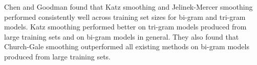 %
%
%
%
%
%

Chen and Goodman found that Katz smoothing and Jelinek-Mercer smoothing performed consistently well across training set sizes for bi-gram and tri-gram models. Katz smoothing performed better on tri-gram models produced from large training sets and on bi-gram models in general. They also found that Church-Gale smoothing outperformed all existing methods on bi-gram models produced from large training sets. %

